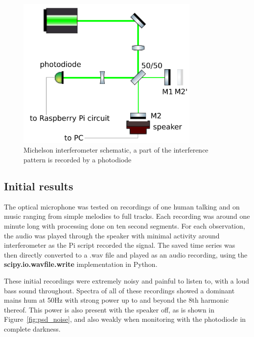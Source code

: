 \documentclass[prb,preprint]{revtex4-1}
\begin{document}
\begin{figure}
	\includegraphics[width=0.8\textwidth]{figures/ifo_schematic_photodiode.pdf}
	\caption{Michelson interferometer schematic, a part of the interference pattern is recorded by a photodiode}
	\label{fig:ifo_schematic_podo}
\end{figure}

\subsection{Initial results}

The optical microphone was tested on recordings of one human talking and on music ranging from simple melodies to full tracks. Each recording was around one minute long with processing done on ten second segments. For each observation, the audio was played through the speaker with minimal activity around interferometer as the Pi script recorded the signal. The saved time series was then directly converted to a .wav file and played as an audio recording, using the \textbf{scipy.io.wavfile.write}\cite{scipy} implementation in Python\cite{python}.


These initial recordings were extremely noisy and painful to listen to, with a loud bass sound throughout. Spectra of all of these recordings showed a dominant mains hum at 50Hz with strong power up to and beyond the 8th harmonic thereof. This power is also present with the speaker off, as is shown in Figure~\ref{fig:psd_noise}, and also weakly when monitoring with the photodiode in complete darkness.
\end{document}
